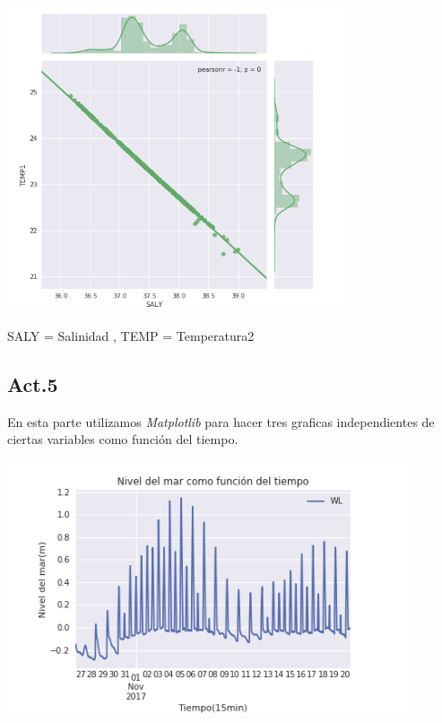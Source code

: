 \documentclass{article}
\begin{document}
\begin{center}
	\includegraphics[width=10cm]{RegSALYTEMP.png}
    
    SALY = Salinidad , TEMP = Temperatura2
\end{center}
\vspace{0.2cm}

\subsection*{Act.5}
En esta parte utilizamos \textit{Matplotlib} para hacer tres graficas independientes de ciertas variables como función del tiempo.

\begin{center}
	\includegraphics[width=12cm]{WLtime.png}
    
\end{center}
\vspace{0.3cm}
\end{document}
